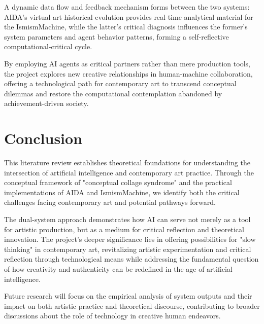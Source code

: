\documentclass{article}
\begin{document}
A dynamic data flow and feedback mechanism forms between the two systems: AIDA's virtual art historical evolution provides real-time analytical material for the IsmismMachine, while the latter's critical diagnosis influences the former's system parameters and agent behavior patterns, forming a self-reflective computational-critical cycle.

By employing AI agents as critical partners rather than mere production tools, the project explores new creative relationships in human-machine collaboration, offering a technological path for contemporary art to transcend conceptual dilemmas and restore the computational contemplation abandoned by achievement-driven society.

\section{Conclusion}

This literature review establishes theoretical foundations for understanding the intersection of artificial intelligence and contemporary art practice. Through the conceptual framework of "conceptual collage syndrome" and the practical implementations of AIDA and IsmismMachine, we identify both the critical challenges facing contemporary art and potential pathways forward.

The dual-system approach demonstrates how AI can serve not merely as a tool for artistic production, but as a medium for critical reflection and theoretical innovation. The project's deeper significance lies in offering possibilities for "slow thinking" in contemporary art, revitalizing artistic experimentation and critical reflection through technological means while addressing the fundamental question of how creativity and authenticity can be redefined in the age of artificial intelligence.

Future research will focus on the empirical analysis of system outputs and their impact on both artistic practice and theoretical discourse, contributing to broader discussions about the role of technology in creative human endeavors.
\end{document}
